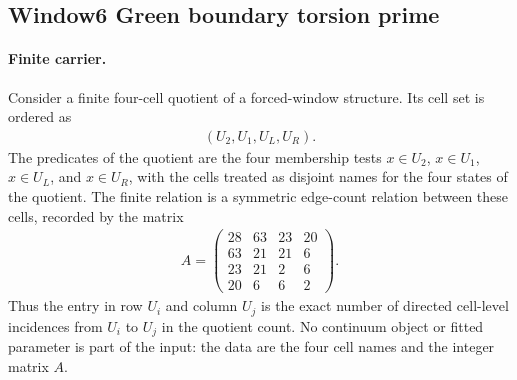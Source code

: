 
\subsection{Window6 Green boundary torsion prime}
\label{subsec:window6-green-boundary-torsion-prime-571-resolvent-link}

\paragraph{Finite carrier.}
Consider a finite four-cell quotient of a forced-window structure. Its cell set is ordered as
$$
\begin{aligned}
(U_2,U_1,U_L,U_R).
\end{aligned}
$$
The predicates of the quotient are the four membership tests $x\in U_2$, $x\in U_1$, $x\in U_L$, and $x\in U_R$, with the cells treated as disjoint names for the four states of the quotient. The finite relation is a symmetric edge-count relation between these cells, recorded by the matrix
$$
\begin{aligned}
A=
\begin{pmatrix}
28&63&23&20\\
63&21&21&6\\
23&21&2&6\\
20&6&6&2
\end{pmatrix}.
\end{aligned}
$$
Thus the entry in row $U_i$ and column $U_j$ is the exact number of directed cell-level incidences from $U_i$ to $U_j$ in the quotient count. No continuum object or fitted parameter is part of the input: the data are the four cell names and the integer matrix $A$.

